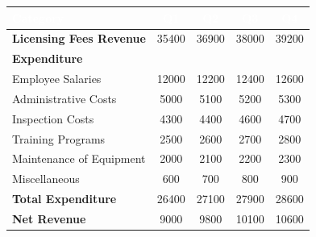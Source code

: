 \documentclass[border=10pt]{standalone}
\begin{document}
\begin{tabular}{l S[table-format=5.0] S[table-format=5.0] S[table-format=5.0] S[table-format=5.0]}
\toprule
{}
\textcolor{white}{\textbf{Category}} & \textcolor{white}{\textbf{Q1}} & \textcolor{white}{\textbf{Q2}} & \textcolor{white}{\textbf{Q3}} & \textcolor{white}{\textbf{Q4}} \\
\midrule
{}
\textbf{Licensing Fees Revenue} & 35400 & 36900 & 38000 & 39200 \\
\midrule
\textbf{Expenditure} & & & & \\
\quad Employee Salaries & 12000 & 12200 & 12400 & 12600 \\
\quad Administrative Costs & 5000 & 5100 & 5200 & 5300 \\
\quad Inspection Costs & 4300 & 4400 & 4600 & 4700 \\
\quad Training Programs & 2500 & 2600 & 2700 & 2800 \\
\quad Maintenance of Equipment & 2000 & 2100 & 2200 & 2300 \\
\quad Miscellaneous & 600 & 700 & 800 & 900 \\
\midrule
\textbf{Total Expenditure} & 26400 & 27100 & 27900 & 28600 \\
\midrule
{}
\textbf{Net Revenue} & 9000 & 9800 & 10100 & 10600 \\
\bottomrule
\end{tabular}
\end{document}
